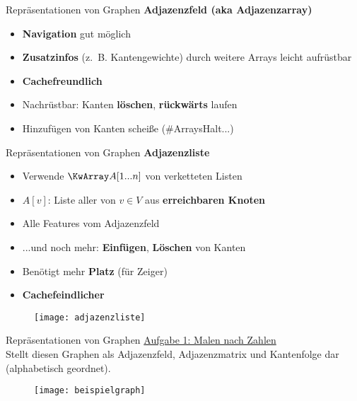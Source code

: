 \begin{frame}{Repräsentationen von Graphen}
	\textbf{Adjazenzfeld (aka Adjazenzarray)} 
		\begin{itemize}
			\item[\Pros] \textbf{Navigation} gut möglich
			\pause
			\item[\Pros] \textbf{Zusatzinfos} (z.~B. Kantengewichte) durch weitere Arrays leicht aufrüstbar
			\pause
			\item[\Pros] \textbf{Cachefreundlich}
			\pause
			\item[\Pros] Nachrüstbar: Kanten \textbf{löschen}, \textbf{rückwärts} laufen 
		\end{itemize}
		\begin{itemize}
			\pause
			\item[\Cons] Hinzufügen von Kanten scheiße \quad (\#ArraysHalt...)
		\end{itemize}
\end{frame}

\begin{frame}{Repräsentationen von Graphen}
	\textbf{Adjazenzliste} 
	\begin{itemize}
		\item Verwende $\KwArray A[1...n]$ von verketteten Listen
		\pause
		\item $A[v]$: Liste aller von $v \in V$ aus \textbf{erreichbaren Knoten} \\
		\forcenewline
		\pause
		\item[\Pros] Alle Features vom Adjazenzfeld
		\pause
		\item[\Pros] ...und noch mehr: \textbf{Einfügen}, \textbf{Löschen} von Kanten 
		\pause
		\item[\Cons] Benötigt mehr \textbf{Platz} (für Zeiger)
		\pause
		\item[\Cons] \textbf{Cachefeindlicher}
	\end{itemize}
	\begin{figure}[htp]
		\centering
		\texttt{[image: adjazenzliste]}
	\end{figure}
\end{frame}

\begin{frame}{Repräsentationen von Graphen}
	\underline{Aufgabe 1: Malen nach Zahlen} \\
	Stellt diesen Graphen als Adjazenzfeld, Adjazenzmatrix und Kantenfolge dar (alphabetisch geordnet).
	\begin{figure}[htp]
		\centering
		\texttt{[image: beispielgraph]}
	\end{figure}
\end{frame}

